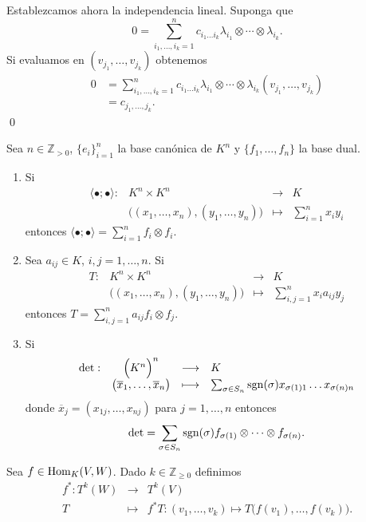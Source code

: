 Establezcamos ahora la independencia lineal. Suponga que
$$0=\sum_{i_1,\ldots,i_k=1}^n c_{i_1\ldots i_k}\lambda_{i_1}\otimes\cdots\otimes\lambda_{i_k}.$$
Si evaluamos en $(v_{j_1},\ldots,v_{j_k})$ obtenemos
\begin{align*}
0 &=\sum_{i_1,\ldots,i_k=1}^n c_{i_1\ldots i_k}\lambda_{i_1}\otimes\cdots\otimes\lambda_{i_k}(v_{j_1},\ldots,v_{j_k})\\
 &=c_{j_1,\ldots,j_k}.
\end{align*}
\qed

\begin{ejem} Sea $n\in\mathbb{Z}_{>0}$, $\{e_i\}_{i=1}^n$ la base can\'onica de $K^n$ y $\{f_1,\ldots,f_n\}$ la base dual.
\begin{enumerate}
\item Si
$$\begin{array}{rccl}
\langle\bullet;\bullet\rangle: & K^n\times K^n &\longrightarrow & K\\
&\Big((x_1,\ldots,x_n),(y_1,\ldots,y_n)\Big) & \longmapsto & \sum_{i=1}^nx_iy_i
\end{array}
$$
entonces $\langle\bullet;\bullet\rangle=\sum_{i=1}^n f_i\otimes f_i$.
\item Sea $a_{ij}\in K$, $i,j=1,\ldots,n$. Si
$$\begin{array}{rccl}
T: & K^n\times K^n&\longrightarrow & K\\
&\Big((x_1,\ldots,x_n),(y_1,\ldots,y_n)\Big) & \longmapsto & \sum_{i,j=1}^nx_ia_{ij}y_j
\end{array}
$$
entonces $T=\sum_{i,j=1}^na_{ij}f_i\otimes f_j$.
\item Si
$$\begin{array}{rccl}
\det: & \Big(K^n\Big)^n &\longrightarrow & K\\
&\big(\overline{x}_1,\ldots,\overline{x}_n\big) & \longmapsto & \sum_{\sigma\in S_n}\operatorname{sgn}(\sigma)x_{\sigma(1)1}\ldots x_{\sigma(n)n}
\end{array}
$$
donde $\overline{x}_j=(x_{1j},\ldots,x_{nj})$ para $j=1,\ldots,n$ entonces $$\det=\sum_{\sigma\in S_n}\operatorname{sgn}(\sigma)f_{\sigma(1)}\otimes\cdots\otimes f_{\sigma(n)}.$$
\end{enumerate}
\end{ejem}

\begin{defn}
Sea $f\in\operatorname{Hom}_K(V,W)$. Dado $k\in\mathbb{Z}_{\ge 0}$ definimos
\begin{eqnarray*}
f^*: T^k(W) & \longrightarrow & T^k(V)\\
  T & \longmapsto & f^*T: (v_1,\ldots,v_k) \mapsto T\big(f(v_1),\ldots,f(v_k)\big).
\end{eqnarray*}
\end{defn}

